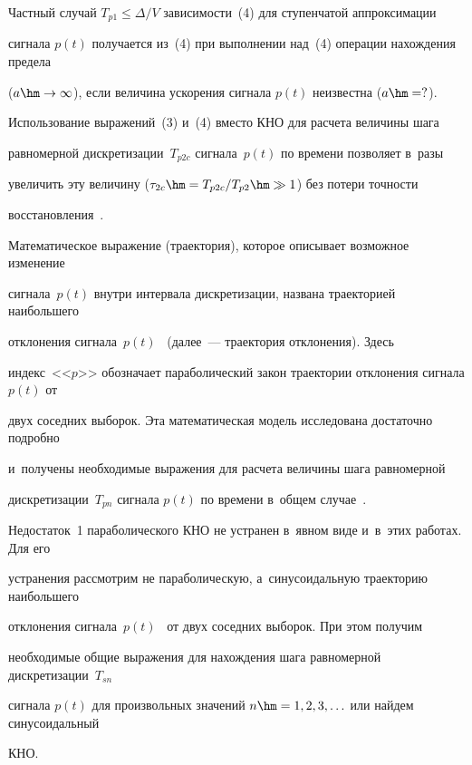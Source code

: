   


  Частный случай $T_{p1}\leq \Delta/V$ зависимости~(4) для ступенчатой аппроксимации 


сигнала $p(t)$ получается из~(4) при выполнении над~(4) операции нахождения предела 


($a\hm\to\infty$), если величина ускорения сигнала $p(t)$ неизвестна ($a\hm=?$).


  


  Использование выражений~(3) и~(4) вместо КНО для расчета величины шага 


равномерной дискретизации~$T_{p2c}$ сигнала~$p(t)$ по времени позволяет в~разы 


увеличить эту величину ($\tau_{2c}\hm=T_{p2c}/T_{p2}\hm\gg 1$) без потери точности 


восстановления~\cite{14-m}.


  


  Математическое выражение (траектория), которое описывает возможное изменение 


сигнала~$p(t)$ внутри интервала дискретизации, названа траекторией наибольшего 


отклонения сигнала~$p(t)$~\cite{14-m, 17-m} (далее~--- траектория отклонения). Здесь 


индекс~<<$p$>> обозначает параболический закон траектории отклонения сигнала $p(t)$ от 


двух соседних выборок. Эта математическая модель исследована достаточно подробно 


и~получены необходимые выражения для расчета величины шага равномерной 


дискретизации~$T_{pn}$ сигнала $p(t)$ по времени в~общем случае~\cite{15-m, 16-m}. 


Недостаток~1 параболического КНО не устранен в~явном виде и~в~этих работах. Для его 


устранения рассмотрим не параболическую, а~синусоидальную траекторию наибольшего 


отклонения сигнала~$p(t)$~\cite{17-m} от двух соседних выборок. При этом получим 


необходимые общие выражения для нахождения шага равномерной дискретизации~$T_{sn}$ 


сигнала $p(t)$ для произвольных значений $n \hm= 1, 2, 3,\ldots$ или найдем синусоидальный 


КНО. 



